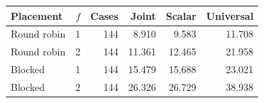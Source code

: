 \begin{tabular}{lrrrrr}\toprule
Placement & $f$ & Cases & Joint & Scalar & Universal\\\midrule
Round robin & 1 & 144 & 8.910 & 9.583 & 11.708 \\
Round robin & 2 & 144 & 11.361 & 12.465 & 21.958 \\
Blocked & 1 & 144 & 15.479 & 15.688 & 23.021 \\
Blocked & 2 & 144 & 26.326 & 26.729 & 38.938 \\
\bottomrule\end{tabular}
